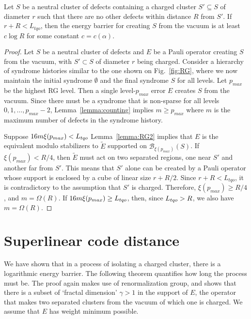 \begin{theorem}
\label{thm:cluster-log-energy-barrier}
Let $S$ be a neutral cluster of defects
containing a charged cluster $S' \subseteq S$ of diameter $r$
such that there are no other defects within distance $R$ from $S'$.
If $r+R < L_{tqo}$,
then the energy barrier for creating $S$ from the vacuum is at least $c \log R$
for some constant $c=c(\alpha)$.
\end{theorem}
\begin{proof}
Let $S$ be a neutral cluster of defects and $E$ be a Pauli operator creating $S$ from the vacuum,
with $S' \subset S$ of diameter $r$ being charged.
Consider a hierarchy of syndrome histories similar to the one shown on Fig.~\ref{fig:RG},
where we now maintain the initial syndrome $\emptyset$ and the final syndrome $S$ for all levels.
Let $p_{max}$ be the highest RG level.
Then a single level-$p_{max}$ error $E$ creates $S$ from the vacuum.
Since there must be a syndrome that is non-sparse for all levels $0,1,\ldots,p_{max}-2$,
Lemma~\ref{lemma:counting} implies $m \ge p_{max}$
where $m$ is the maximum number of defects in the syndrome history.

Suppose $16 m \xi(p_{max}) < {L_{tqo}}$ 
Lemma~\ref{lemma:RG2} implies that 
$E$ is the equivalent modulo stabilizers to $\tilde{E}$ 
supported on $\mathcal B _{\xi(p_{max})}(S)$.
If $\xi(p_{max}) < R/4$,
then $\tilde{E}$ must act on two separated regions, one near $S'$ and another far from $S'$.
This means that $S'$ alone can be created by a Pauli operator whose support is enclosed by a cube of linear size $r+R/2$.
Since $r+R < L_{tqo}$, it is contradictory to the assumption that $S'$ is charged.
Therefore, $\xi(p_{max}) \ge R/4$, and $m = \Omega(R)$.
%
If $16 m \xi(p_{max}) \ge {L_{tqo}}$, then, since ${L_{tqo}} > R$, we also have $m = \Omega(R)$.
\end{proof}



\section{Superlinear code distance}
\label{sec:superlinear-distance}

We have shown that in a process of isolating a charged cluster, there is a logarithmic energy barrier.
The following theorem quantifies how long the process must be.
%
The proof again makes use of renormalization group,
and shows that there is a subset of `fractal dimension' $\gamma > 1$ in the support of $E$,
the operator that makes two separated clusters from the vacuum of which one is charged.
We assume that $E$ has weight minimum possible.

